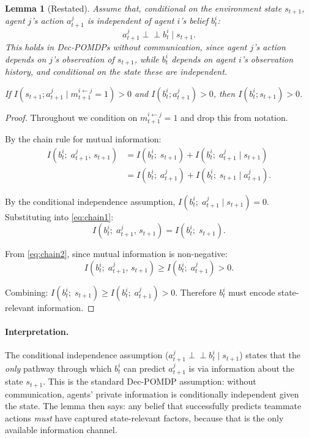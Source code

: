 \documentclass{article}
\theoremstyle{plain}
\newtheorem{lemma}[theorem]{Lemma}
\theoremstyle{definition}
\theoremstyle{remark}
\begin{document}
\begin{lemma}[Restated]
Assume that, conditional on the environment state $s_{t+1}$, agent $j$'s action $a_{t+1}^j$ is independent of agent $i$'s belief $b_t^i$:
\[
a_{t+1}^j \perp\!\!\!\perp b_t^i \mid s_{t+1}.
\]
This holds in Dec-POMDPs without communication, since agent $j$'s action depends on $j$'s observation of $s_{t+1}$, while $b_t^i$ depends on agent $i$'s observation history, and conditional on the state these are independent.

If $I(s_{t+1}; a_{t+1}^j \mid m_{t+1}^{i \leftarrow j} = 1) > 0$ and $I(b_t^i; a_{t+1}^j) > 0$, then $I(b_t^i; s_{t+1}) > 0$.
\end{lemma}

\begin{proof}
Throughout we condition on $m_{t+1}^{i \leftarrow j} = 1$ and drop this from notation.

By the chain rule for mutual information:
\begin{align}
I(b_t^i;\; a_{t+1}^j,\, s_{t+1})
&= I(b_t^i;\; s_{t+1}) + I(b_t^i;\; a_{t+1}^j \mid s_{t+1}) \label{eq:chain1}\\
&= I(b_t^i;\; a_{t+1}^j) + I(b_t^i;\; s_{t+1} \mid a_{t+1}^j). \label{eq:chain2}
\end{align}

By the conditional independence assumption, $I(b_t^i;\; a_{t+1}^j \mid s_{t+1}) = 0$. Substituting into \eqref{eq:chain1}:
\[
I(b_t^i;\; a_{t+1}^j,\, s_{t+1}) = I(b_t^i;\; s_{t+1}).
\]

From \eqref{eq:chain2}, since mutual information is non-negative:
\[
I(b_t^i;\; a_{t+1}^j,\, s_{t+1}) \geq I(b_t^i;\; a_{t+1}^j) > 0.
\]

Combining: $I(b_t^i;\; s_{t+1}) \geq I(b_t^i;\; a_{t+1}^j) > 0$. Therefore $b_t^i$ must encode state-relevant information.
\end{proof}

\paragraph{Interpretation.} The conditional independence assumption ($a_{t+1}^j \perp\!\!\!\perp b_t^i \mid s_{t+1}$) states that the \emph{only} pathway through which $b_t^i$ can predict $a_{t+1}^j$ is via information about the state $s_{t+1}$. This is the standard Dec-POMDP assumption: without communication, agents' private information is conditionally independent given the state. The lemma then says: any belief that successfully predicts teammate actions \emph{must} have captured state-relevant factors, because that is the only available information channel.
\end{document}
